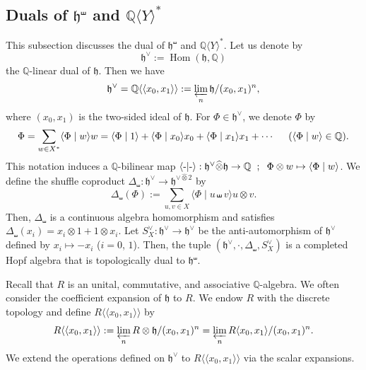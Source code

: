 \documentclass[15pt,oneside,reqno]{amsart}
\theoremstyle{remark}{
\newtheorem{lem}[df]{Lemma}
\newtheorem{prop}[df]{Proposition}
\newtheorem{ex}[df]{Example}
\newtheorem{rmk}[df]{Remark}
}
\DeclareMathOperator{\Hom}{Hom}
\newcommand{\ide}[1]{\mathfrak{#1}}
\newcommand{\Q}{\mathbb{Q}}
\newcommand{\cotimes}{\widehat{\otimes}}
\begin{document}
\subsection{Duals of $\ide{h}^{\shuffle}$ and $\Q\langle Y \rangle^*$}\label{subsect:dual-of-h}
This subsection discusses the dual of $\ide{h}^{\shuffle}$ and $\Q\langle Y \rangle^*$.
Let us denote by
\[
\ide{h}^{\vee} := \Hom(\ide{h},\Q)
\]
the $\Q$-linear dual of $\ide{h}$.
Then we have
\[
\ide{h}^{\vee} = \mathbb{Q}\langle \langle x_0,x_1 \rangle \rangle:= \varprojlim_{n}\ide{h}/ (x_0,x_1)^n,
\]
where $(x_0,x_1)$ is the two-sided ideal of $\ide{h}$.
 For $\Phi \in \ide{h}^{\vee}$, we denote $\Phi$ by
\[
\Phi = \sum_{w\in X^*} \langle \Phi \mid w \rangle w = \langle \Phi \mid 1 \rangle + \langle \Phi \mid x_0 \rangle x_0 + \langle \Phi \mid x_1 \rangle x_1 + \cdots \hspace{0.5cm}( \langle \Phi \mid w \rangle \in \mathbb{Q}).
\]
This notation induces a $\mathbb{Q}$-bilinear map $\langle \mathchar`- | \mathchar`-\rangle : \ide{h}^{\vee} \cotimes \ide{h} \rightarrow \mathbb{Q} \hspace{0.2cm} ; \hspace{0.2cm}  \Phi \otimes w \mapsto \langle \Phi \mid w \rangle$.
We define the shuffle coproduct $\Delta_{\shuffle} : \ide{h}^{\vee} \rightarrow  \ide{h}^{\vee\cotimes 2}$ by
\[
\Delta_{\shuffle}(\Phi) := \sum_{u,v\in X} \langle \Phi \mid u\shuffle v \rangle u\otimes v. 
\]
Then, $\Delta_{\shuffle}$ is a continuous algebra homomorphism and satisfies $\Delta_{\shuffle}(x_i) = x_i \otimes 1 + 1\otimes x_i$.
Let $S_X^{\vee} : \ide{h}^{\vee}\rightarrow \ide{h}^{\vee}$ be the anti-automorphism of $\ide{h}^{\vee}$ defined by $x_i \mapsto -x_i$ ($i = 0$, $1$).
Then, the tuple $(\ide{h}^{\vee}, \cdot, \Delta_{\shuffle},S^{\vee}_X)$ is a completed Hopf algebra that is topologically dual to $\ide{h}^{\shuffle}$.

Recall that $R$ is an unital, commutative, and associative $\Q$-algebra.
We often consider the coefficient expansion of $\ide{h}$ to $R$.
We endow $R$ with the discrete topology and define $R\langle \langle x_0,x_1 \rangle \rangle$ by
\[
R\langle \langle x_0,x_1 \rangle \rangle := \varprojlim_{n} R\otimes \ide{h} / (x_0,x_1)^n = \varprojlim_{n} R\langle x_0,x_1\rangle / (x_0,x_1)^n.
\]
We extend the operations defined on $\ide{h}^{\vee}$ to $R \langle \langle x_0,x_1 \rangle \rangle$ via the scalar expansions.
\end{document}
